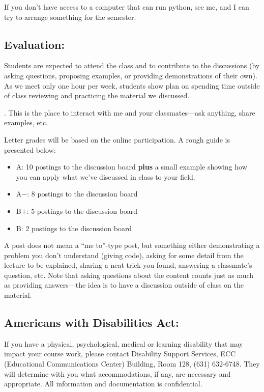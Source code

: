 \documentclass[11pt]{article}
\begin{document}
\noindent
If you don't have access to a computer that can run python, see me,
and I can try to arrange something for the semester.


\subsection*{Evaluation:} 

Students are expected to attend the class and to contribute
to the discussions (by asking questions, proposing examples, or
providing demonstrations of their own).  As we meet only one hour per
week, students show plan on spending time outside of class reviewing
and practicing the material we discussed. 

.  This is the place to interact with
me and your classmates---ask anything, share examples, etc. 

\noindent Letter grades will be based on the online participation.  A
rough guide is presented below:
\begin{itemize}
\item {\sf A\phantom{+}}: 10 postings to the discussion board
  {\bf plus} a small example showing how you can apply what
  we've discussed in class to your field.

\item {\sf A$-$}: 8 postings to the discussion board

\item {\sf B$+$}: 5 postings to the discussion board

\item {\sf B\phantom{+}}:  2 postings to the discussion board
\end{itemize}
A post does not mean a ``me to''-type post, but something either
demonstrating a problem you don't understand (giving code), asking for
some detail from the lecture to be explained, sharing a neat trick you
found, answering a classmate's question, etc.  Note that asking
questions about the content counts just as much as providing
answers---the idea is to have a discussion outside of class on the
material.



\subsection*{Americans with Disabilities Act: }

\noindent If you have a physical, psychological, medical or learning
disability that may impact your course work, please contact Disability
Support Services, ECC (Educational Communications Center) Building,
Room 128, (631) 632-6748. They will determine with you what
accommodations, if any, are necessary and appropriate. All information
and documentation is confidential.
\end{document}
